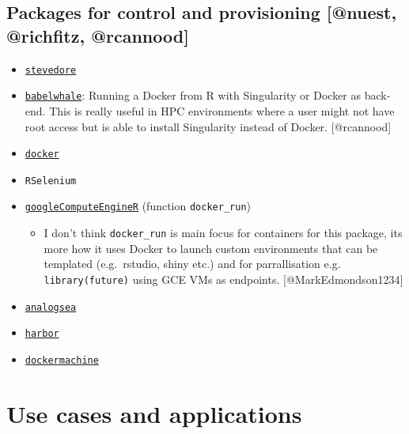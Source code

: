 \hypertarget{packages-for-control-and-provisioning-richfitz-rcannoodnuest-richfitz-rcannood}{%
\subsection{\texorpdfstring{Packages for control and provisioning
{[}@nuest, @richfitz,
@rcannood{]}}{Packages for control and provisioning , @richfitz, @rcannood{[}@nuest, @richfitz, @rcannood{]}}}\label{packages-for-control-and-provisioning-richfitz-rcannoodnuest-richfitz-rcannood}}

\begin{itemize}
\tightlist
\item
  \href{https://github.com/richfitz/stevedore}{\texttt{stevedore}}
\item
  \href{https://cran.r-project.org/web/packages/babelwhale/index.html}{\texttt{babelwhale}}:
  Running a Docker from R with Singularity or Docker as back-end. This
  is really useful in HPC environments where a user might not have root
  access but is able to install Singularity instead of Docker.
  {[}@rcannood{]}
\item
  \href{https://bhaskarvk.github.io/docker/}{\texttt{docker}}
\item
  \texttt{RSelenium}
\item
  \href{https://cloudyr.github.io/googleComputeEngineR/}{\texttt{googleComputeEngineR}}
  (function \texttt{docker\_run})

  \begin{itemize}
  \tightlist
  \item
    I don't think \texttt{docker\_run} is main focus for containers for
    this package, its more how it uses Docker to launch custom
    environments that can be templated (e.g.~rstudio, shiny etc.) and
    for parrallisation e.g. \texttt{library(future)} using GCE VMs as
    endpoints. {[}@MarkEdmondson1234{]}
  \end{itemize}
\item
  \href{https://github.com/sckott/analogsea}{\texttt{analogsea}}
\item
  \href{https://github.com/wch/harbor/}{\texttt{harbor}}
\item
  \href{https://github.com/cboettig/dockermachine}{\texttt{dockermachine}}
\end{itemize}

\hypertarget{use-cases-and-applications}{%
\section{Use cases and applications}\label{use-cases-and-applications}}

